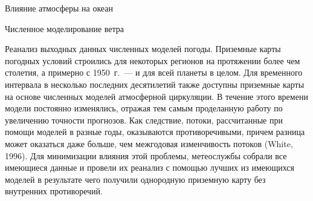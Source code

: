 \begin{chapter}{Влияние атмосферы на океан}
\begin{section}{Численное моделирование ветра}
\begin{paragraph}{Реанализ выходных данных численных моделей погоды.}
Приземные карты погодных условий строились для некоторых регионов 
на протяжении более чем столетия, а примерно с 1950~г.~--- и для всей планеты 
в целом. Для временного интервала в несколько последних десятилетий также
доступны приземные карты на основе численных моделей атмосферной циркуляции.
В течение этого времени модели постоянно изменялись, отражая тем самым 
проделанную работу по увеличению точности прогнозов. Как следствие, потоки, 
рассчитанные при помощи моделей в разные годы, оказываются 
противоречивыми, причем разница может оказаться даже больше, чем межгодовая
изменчивость потоков (White, 1996). Для минимизации влияния этой проблемы,
метеослужбы собрали все имеющиеся данные и провели их реанализ
с помощью лучших из имеющихся моделей в результате чего получили однородную 
приземную карту без внутренних противоречий.
%


\end{paragraph}
\end{section}
\end{chapter}
